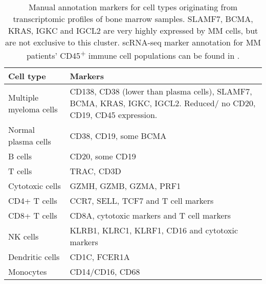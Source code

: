 \begin{table}[ht]
    \centering
\begin{tabular}{|p{3cm}|p{9cm}|}
\hline
\textbf{Cell type}     & \textbf{Markers} \\ \hline
Multiple myeloma cells & CD138, CD38 (lower than plasma cells), SLAMF7,  BCMA, KRAS, IGKC, IGCL2. Reduced/ no CD20, CD19, CD45 expression.   \\ \hline
Normal plasma cells    & CD38, CD19, some BCMA \\ \hline
B cells                & CD20, some CD19 \\ \hline
T cells                &  TRAC, CD3D  \\ \hline
Cytotoxic cells        &  GZMH,  GZMB,  GZMA,  PRF1  \\ \hline
CD4+ T cells           & CCR7, SELL, TCF7 and T cell markers  \\ \hline
CD8+ T cells           & CD8A, cytotoxic markers and T cell markers  \\ \hline
NK cells               & KLRB1, KLRC1, KLRF1, CD16 and cytotoxic markers \\ \hline
Dendritic cells        & CD1C, FCER1A  \\ \hline
Monocytes              & CD14/CD16, CD68 \\ \hline
\end{tabular}
\caption[MM annotation gene marker expression]{Manual annotation markers for cell types originating from transcriptomic profiles of bone marrow samples.
SLAMF7, BCMA, KRAS, IGKC and IGCL2 are very highly expressed by MM cells, but are not exclusive to this cluster.
scRNA-seq marker annotation for MM patients' CD45\textsuperscript{+} immune cell populations can be found in \cite{zavidij2019single}.}
\label{tab:annotation_markers}
\end{table}
